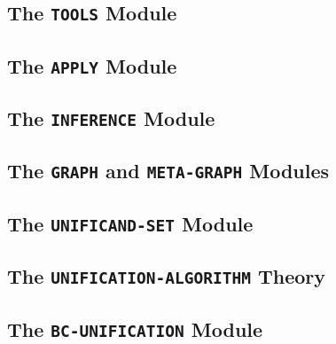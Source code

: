 \documentclass[11pt]{article}
\begin{document}
\subsection{The \lstinline|TOOLS| Module} \label{subappendix:tools-mod}

\vspace{2em}

\subsection{The \lstinline|APPLY| Module} \label{subappendix:apply-mod}

\vspace{2em}

\subsection{The \lstinline|INFERENCE| Module}\label{subappendix:inference-mod}

\vspace{2em}

\subsection{The \lstinline|GRAPH| and \lstinline|META-GRAPH| Modules}
\label{subappendix:graph-mod}

\vspace{2em}

\subsection{The \lstinline|UNIFICAND-SET| Module}\label{subappendix:unificand-set-mod}

\vspace{2em}

\subsection{The \lstinline|UNIFICATION-ALGORITHM| Theory}\label{subappendix:unif-alg-theory}

\vspace{2em}

\subsection{The \lstinline|BC-UNIFICATION| Module}\label{subappendix:bc-unif-mod}

\vspace{2em}
\end{document}
